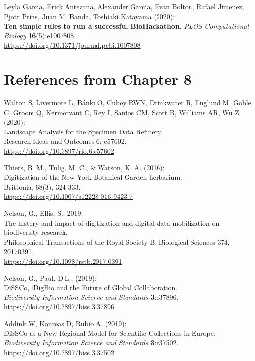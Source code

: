 \begin{thebibliography}{9}
 Leyla Garcia, Erick Antezana, Alexander Garcia, Evan Bolton,
Rafael Jimenez, Pjotr Prins, Juan M. Banda, Toshiaki Katayama (2020):\\
\textbf{Ten simple rules to run a successful BioHackathon}. \emph{PLOS
Computational Biology} \textbf{16}(5):e1007808.\\
\url{https://doi.org/10.1371/journal.pcbi.1007808}



\section{References from Chapter 8}

 Walton S, Livermore L, Bánki O, Cubey RWN, Drinkwater R, Englund
M, Goble C, Groom Q, Kermorvant C, Rey I, Santos CM, Scott B, Williams
AR, Wu Z (2020):\\
Landscape Analysis for the Specimen Data Refinery.\\
Research Ideas and Outcomes 6: e57602.\\
\url{https://doi.org/10.3897/rio.6.e57602}

 Thiers, B. M., Tulig, M. C., \& Watson, K. A. (2016):\\
Digitization of the New York Botanical Garden herbarium.\\
Brittonia, 68(3), 324-333.\\
\url{https://doi.org/10.1007/s12228-016-9423-7}

 Nelson, G., Ellis, S., 2019:\\
The history and impact of digitization and digital data mobilization on
biodiversity research.\\
Philosophical Transactions of the Royal Society B: Biological Sciences
374, 20170391.\\
\url{https://doi.org/10.1098/rstb.2017.0391}

 Nelson, G., Paul, D.L., (2019):\\
DiSSCo, iDigBio and the Future of Global Collaboration.\\
\emph{Biodiversity Information Science and Standards}
\textbf{3}:e37896.\\
\url{https://doi.org/10.3897/biss.3.37896}

 Addink W, Koureas D, Rubio A. (2019):\\
DiSSCo as a New Regional Model for Scientific Collections in Europe.
\emph{Biodiversity Information Science and Standards}
\textbf{3}:e37502.\\
\url{https://doi.org/10.3897/biss.3.37502}


\end{thebibliography}
